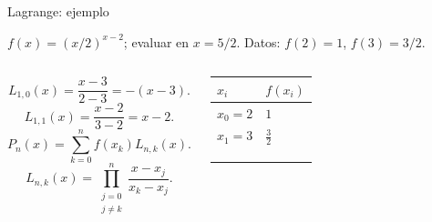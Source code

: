 \documentclass[main.tex]{subfiles}
\begin{document}
\begin{frame}[t]{Lagrange: ejemplo}
\par\noindent\begin{minipage}[t][7.5mm][t]{\textwidth}\small\strut $f(x)=(x/2)^{x-2}$; evaluar en $x=5/2$. Datos: $f(2)=1$, $f(3)=3/2$.\end{minipage}\par\nointerlineskip
\begin{columns}[T]\small\setlength{\abovedisplayskip}{4pt}\setlength{\belowdisplayskip}{4pt}\small\[L_{1,0}(x)=\frac{x-3}{2-3}=-(x-3).\]
\[L_{1,1}(x)=\frac{x-2}{3-2}=x-2.\]\[P_n(x)=\sum_{k=0}^n f(x_k)L_{n,k}(x).\]\[L_{n,k}(x)=\prod_{\substack{j=0\\j\ne k}}^n\frac{x-x_j}{x_k-x_j}.\]\begingroup\small\setlength{\tabcolsep}{3pt}\begin{center}\begin{tabular}{|C{.42\textwidth}|C{.42\textwidth}|}\hline
\rule[-2mm]{0pt}{6mm}$x_i$&$f(x_i)$\\\hline
\rule[-2.5mm]{0pt}{6mm}$x_0=2$&$1$\\\hline
\rule[-2.5mm]{0pt}{6mm}$x_1=3$&$\frac{3}{2}$\\\hline
\rule[-2.5mm]{0pt}{6mm}&\\\hline
\rule[-2.5mm]{0pt}{6mm}&\\\hline
\rule[-2.5mm]{0pt}{6mm}&\\\hline
\end{tabular}\end{center}\endgroup\par
\end{columns}
\end{frame}
\end{document}
